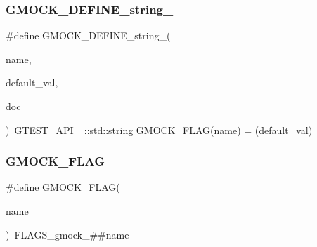 \mbox{\label{gmock-port_8h_ad6badbf90e5a813e2bd5668fc6b6a8f7}} 
\subsubsection{\texorpdfstring{GMOCK\_DEFINE\_string\_}{GMOCK\_DEFINE\_string\_}}
{\footnotesize\ttfamily \#define G\+M\+O\+C\+K\+\_\+\+D\+E\+F\+I\+N\+E\+\_\+string\+\_\+(\begin{DoxyParamCaption}\item[{}]{name,  }\item[{}]{default\+\_\+val,  }\item[{}]{doc }\end{DoxyParamCaption})~\mbox{\hyperlink{gtest-port_8h_aa73be6f0ba4a7456180a94904ce17790}{G\+T\+E\+S\+T\+\_\+\+A\+P\+I\+\_\+}} \+::std\+::string \mbox{\hyperlink{gmock-port_8h_ad7119adfef06be5e7b1551633f5a1436}{G\+M\+O\+C\+K\+\_\+\+F\+L\+AG}}(name) = (default\+\_\+val)}

\mbox{\label{gmock-port_8h_ad7119adfef06be5e7b1551633f5a1436}} 
\subsubsection{\texorpdfstring{GMOCK\_FLAG}{GMOCK\_FLAG}}
{\footnotesize\ttfamily \#define G\+M\+O\+C\+K\+\_\+\+F\+L\+AG(\begin{DoxyParamCaption}\item[{}]{name }\end{DoxyParamCaption})~F\+L\+A\+G\+S\+\_\+gmock\+\_\+\#\#name}

